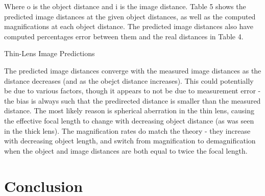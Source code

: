 \documentclass[journal]{IEEEtran}
\begin{document}
Where o is the object distance and i is the image distance. Table 5 shows the
predicted image distances at the given object distances, as well as the
computed magnifications at each object distance. The predicted image distances
also have computed percentages error between them and the real distances in
Table 4.

\begin{table}[ht!]
    \centering
    \caption*{\normalsize{Thin-Lens Image Predictions}}
    \medskip
    \caption*{Table 5: Magnifications and predirected image distances of thin
    lens at varying object distances.}
\end{table}

The predicted image distances converge with the measured image distances as the
distance decreases (and as the obejct distance increases). This could
potentially be due to various factors, though it appears to not be due to
measurement error - the bias is always such that the predirected distance is
smaller than the measured distance. The most likely reason is spherical
aberration in the thin lens, causing the effective focal length to change with
decreasing object distance (as was seen in the thick lens). The magnification
rates do match the theory - they increase with decreasing object length, and
switch from magnification to demagnification when the object and image
distances are both equal to twice the focal length.

\section{Conclusion}
\end{document}
